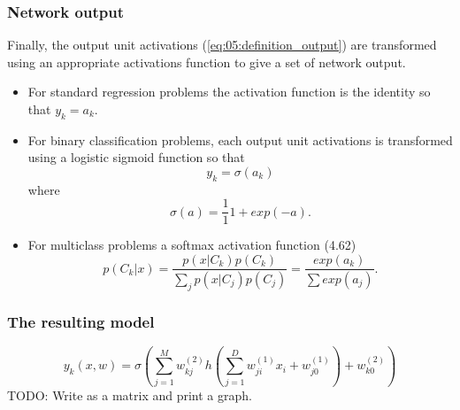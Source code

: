 \begin{frame}
  \frametitle{Network output}
  Finally, the output unit activations (\ref{eq:05:definition_output}) 
  are transformed using an appropriate activations function to give 
  a set of network output. 
  
  \begin{itemize}
    \item For standard regression problems the activation function is the identity so that $y_k = a_k$. 
    \item For binary classification problems, each output unit activations is transformed using a logistic sigmoid function so that 
    \begin{equation}
      y_k = \sigma(a_k)
    \end{equation}
    where 
    \begin{equation}
      \sigma(a)
      = 
      \frac{1}{1}{1  + exp(-a)}.
    \end{equation}

    \item For multiclass problems a softmax activation function (4.62)
    \begin{equation}
      p(C_k | x)
      = 
      \frac{p(x|C_k) p(C_k)}{\sum_j p(x|C_j)p(C_j)}
      = 
      \frac{exp(a_k)}{\sum{exp(a_j)}}.
    \end{equation}
  \end{itemize}
\end{frame}

\begin{frame}
  \frametitle{The resulting model}

  \begin{equation}
    y_k(x, w)
    = 
    \sigma
    \left(
    \sum_{j = 1}^M
      w_{k j}^{(2)}
      h 
      \left(
        \sum_{j = 1}^D
          w_{j i}^{(1)} x_i
          +
          w_{j 0}^{(1)}
      \right)
      +
      w_{k 0}^{(2)}
    \right) 
  \end{equation}
TODO: Write as a matrix and print a graph.
\end{frame}


    